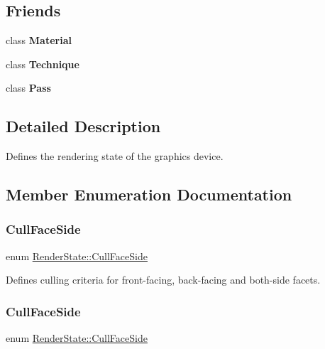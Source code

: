 \subsection*{Friends}
\begin{DoxyCompactItemize}
\item 
\mbox{\label{classRenderState_a76b09dbbfd6aad2807be6181db6bd2e4}} 
class {\bfseries Material}
\item 
\mbox{\label{classRenderState_a0a6534d15d196a09d979b9b093c6836d}} 
class {\bfseries Technique}
\item 
\mbox{\label{classRenderState_abe77423eb27f643233ef051559a64882}} 
class {\bfseries Pass}
\end{DoxyCompactItemize}


\subsection{Detailed Description}
Defines the rendering state of the graphics device. 

\subsection{Member Enumeration Documentation}
\mbox{\label{classRenderState_a9b99d2625b13af77f1f8fa8101e3ad85}} 
\subsubsection{\texorpdfstring{Cull\+Face\+Side}{CullFaceSide}\hspace{0.1cm}{\footnotesize\ttfamily [1/2]}}
{\footnotesize\ttfamily enum \hyperlink{classRenderState_a9b99d2625b13af77f1f8fa8101e3ad85}{Render\+State\+::\+Cull\+Face\+Side}}

Defines culling criteria for front-\/facing, back-\/facing and both-\/side facets. \mbox{\label{classRenderState_a9b99d2625b13af77f1f8fa8101e3ad85}} 
\subsubsection{\texorpdfstring{Cull\+Face\+Side}{CullFaceSide}\hspace{0.1cm}{\footnotesize\ttfamily [2/2]}}
{\footnotesize\ttfamily enum \hyperlink{classRenderState_a9b99d2625b13af77f1f8fa8101e3ad85}{Render\+State\+::\+Cull\+Face\+Side}}

